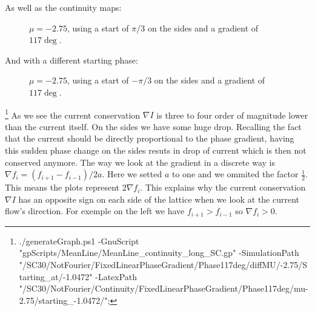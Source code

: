 \documentclass[../main.tex]{subfiles}
\begin{document}
As well as the continuity maps:
\begin{figure}[H]
    \centering
    
    \caption{$\mu = -2.75$, using a start of $\pi/3$ on the sides and a gradient of $117\si{\deg}$.}
\end{figure}
And  with a different starting phase:
\begin{figure}[H]
    \centering
    
    \caption{$\mu = -2.75$, using a start of $-\pi/3$ on the sides and a gradient of $117\si{\deg}$.}
\end{figure}
\footnote{./generateGraph.ps1 -GnuScript "gpScripts/MeanLine/MeanLine\_continuity\_long\_SC.gp" -SimulationPath "/SC30/NotFourier/FixedLinearPhaseGradient/Phase117deg/diffMU/-2.75/Starting\_at/-1.0472" -LatexPath "/SC30/NotFourier/Continuity/FixedLinearPhaseGradient/Phase117deg/mu-2.75/starting\_-1.0472/";}
As we see the current conservation $\nabla I$ is three to four order of magnitude lower than the current itself. On the sides we have some huge drop. 
Recalling the fact that the current should be directly proportional to the phase gradient, having this sudden phase change 
on the sides resuts in drop of current which is then not conserved anymore. The way we look at the gradient in a discrete
way is $\nabla f_i = (f_{i+1} - f_{i-1})/2a$. Here we setted $a$ to one and we ommited the factor $\frac{1}{2}$. This
means the plots represent $2\nabla f_i$. This explains why the current conservation $\nabla I$ has an opposite sign on each side of the lattice
when we look at the current flow's direction. For exemple on the left we have $f_{i+1} > f_{i-1}$ so $\nabla f_i > 0$. 
%     

%     
\end{document}
